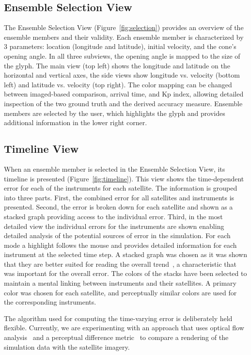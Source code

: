 \documentclass{vgtc}                          %
\begin{document}
\subsection{Ensemble Selection View} \label{sec:selection}
The Ensemble Selection View (Figure~\ref{fig:selection}) provides an overview of the ensemble members and their validity. Each ensemble member is characterized by 3 parameters: location (longitude and latitude), initial velocity, and the cone's opening angle. In all three subviews, the opening angle is mapped to the size of the glyph. The main view (top left) shows the longitude and latitude on the horizontal and vertical axes, the side views show longitude vs. velocity (bottom left) and latitude vs. velocity (top right). The color mapping can be changed between imaged-based comparison, arrival time, and Kp index, allowing detailed inspection of the two ground truth and the derived accuracy measure. Ensemble members are selected by the user, which highlights the glyph and provides additional information in the lower right corner. 

\subsection{Timeline View} \label{sec:timeline}
When an ensemble member is selected in the Ensemble Selection View, its timeline is presented (Figure~\ref{fig:timeline}). This view shows the time-dependent error for each of the instruments for each satellite. The information is grouped into three parts. First, the combined error for all satellites and instruments is presented. Second, the error is broken down for each satellite and shown as a stacked graph providing access to the individual error. Third, in the most detailed view the individual errors for the instruments are shown enabling detailed analysis of the potential sources of error in the simulation. For each mode a highlight follows the mouse and provides detailed information for each instrument at the selected time step. A stacked graph was chosen as it was shown that they are better suited for reading the overall trend~\cite{byron2008stacked}, a characteristic that was important for the overall error. The colors of the stacks have been selected to maintain a mental linking between instruments and their satellites. A primary color was chosen for each satellite, and perceptually similar colors are used for the corresponding instruments.

The algorithm used for computing the time-varying error is deliberately held flexible. Currently, we are experimenting with an approach that uses optical flow analysis~\cite{sun2010secrets} and a perceptual difference metric~\cite{yee2004perceptual} to compare a rendering of the simulation data with the satellite imagery.
\end{document}

